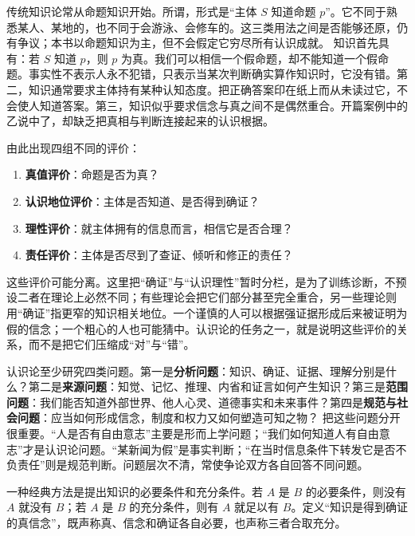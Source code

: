 传统知识论常从命题知识开始。所谓，形式是“主体 $S$ 知道命题 $p$”。它不同于熟悉某人、某地的，也不同于会游泳、会修车的。这三类用法之间是否能够还原，仍有争议；本书以命题知识为主，但不会假定它穷尽所有认识成就。 知识首先具有：若 $S$ 知道 $p$，则 $p$ 为真。我们可以相信一个假命题，却不能知道一个假命题。事实性不表示人永不犯错，只表示当某次判断确实算作知识时，它没有错。第二，知识通常要求主体持有某种认知态度。把正确答案印在纸上而从未读过它，不会使人知道答案。第三，知识似乎要求信念与真之间不是偶然重合。开篇案例中的乙说中了，却缺乏把真相与判断连接起来的认识根据。

由此出现四组不同的评价：
\begin{enumerate}
  \item \textbf{真值评价}：命题是否为真？
  \item \textbf{认识地位评价}：主体是否知道、是否得到确证？
  \item \textbf{理性评价}：就主体拥有的信息而言，相信它是否合理？
  \item \textbf{责任评价}：主体是否尽到了查证、倾听和修正的责任？
\end{enumerate}
这些评价可能分离。这里把“确证”与“认识理性”暂时分栏，是为了训练诊断，不预设二者在理论上必然不同；有些理论会把它们部分甚至完全重合，另一些理论则用“确证”指更窄的知识相关地位。一个谨慎的人可以根据强证据形成后来被证明为假的信念；一个粗心的人也可能猜中。认识论的任务之一，就是说明这些评价的关系，而不是把它们压缩成“对”与“错”。

认识论至少研究四类问题。第一是\textbf{分析问题}：知识、确证、证据、理解分别是什么？第二是\textbf{来源问题}：知觉、记忆、推理、内省和证言如何产生知识？第三是\textbf{范围问题}：我们能否知道外部世界、他人心灵、道德事实和未来事件？第四是\textbf{规范与社会问题}：应当如何形成信念，制度和权力又如何塑造可知之物？ 把这些问题分开很重要。“人是否有自由意志”主要是形而上学问题；“我们如何知道人有自由意志”才是认识论问题。“某新闻为假”是事实判断；“在当时信息条件下转发它是否不负责任”则是规范判断。问题层次不清，常使争论双方各自回答不同问题。

一种经典方法是提出知识的必要条件和充分条件。若 $A$ 是 $B$ 的必要条件，则没有 $A$ 就没有 $B$；若 $A$ 是 $B$ 的充分条件，则有 $A$ 就足以有 $B$。定义“知识是得到确证的真信念”，既声称真、信念和确证各自必要，也声称三者合取充分。

